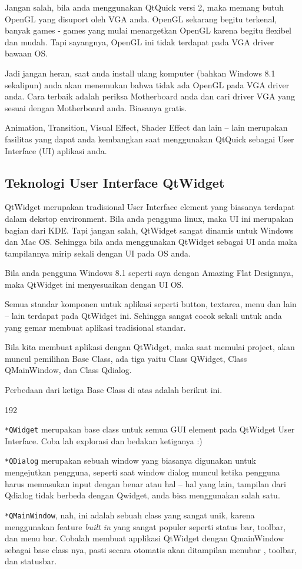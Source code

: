 Jangan salah, bila anda menggunakan QtQuick versi 2, maka memang butuh
OpenGL yang disuport oleh VGA anda. OpenGL sekarang begitu terkenal,
banyak games - games yang mulai menargetkan OpenGL karena begitu
flexibel dan mudah. Tapi sayangnya, OpenGL ini tidak terdapat pada VGA
driver bawaan OS.

Jadi jangan heran, saat anda install ulang komputer (bahkan Windows 8.1
sekalipun) anda akan menemukan bahwa tidak ada OpenGL pada VGA driver
anda. Cara terbaik adalah periksa Motherboard anda dan cari driver VGA
yang sesuai dengan Motherboard anda. Biasanya gratis.

Animation, Transition, Visual Effect, Shader Effect dan lain -- lain
merupakan fasilitas yang dapat anda kembangkan saat menggunakan QtQuick
sebagai User Interface (UI) aplikasi anda.

\subsection{Teknologi User Interface QtWidget}\label{teknologi-user-interface-qtwidget}

QtWidget merupakan tradisional User Interface element yang biasanya
terdapat dalam dekstop environment. Bila anda pengguna linux, maka UI
ini merupakan bagian dari KDE. Tapi jangan salah, QtWidget sangat
dinamis untuk Windows dan Mac OS. Sehingga bila anda menggunakan
QtWidget sebagai UI anda maka tampilannya mirip sekali dengan UI pada OS
anda.

Bila anda pengguna Windows 8.1 seperti saya dengan Amazing Flat
Designnya, maka QtWidget ini menyesuaikan dengan UI OS.

Semua standar komponen untuk aplikasi seperti button, textarea, menu dan
lain -- lain terdapat pada QtWidget ini. Sehingga sangat cocok sekali
untuk anda yang gemar membuat aplikasi tradisional standar.

Bila kita membuat aplikasi dengan QtWidget, maka saat memulai project,
akan muncul pemilihan Base Class, ada tiga yaitu Class QWidget, Class
QMainWindow, dan Class Qdialog.

Perbedaan dari ketiga Base Class di atas adalah berikut ini.

\begin{dingautolist}{192}
\item
  \texttt{*QWidget} merupakan base class untuk semua GUI element pada
  QtWidget User Interface. Coba lah explorasi dan bedakan ketiganya :)
\item
  \texttt{*QDialog} merupakan sebuah window yang biasanya digunakan
  untuk mengejutkan pengguna, seperti saat window dialog muncul ketika
  pengguna harus memasukan input dengan benar atau hal -- hal yang lain,
  tampilan dari Qdialog tidak berbeda dengan Qwidget, anda bisa
  menggunakan salah satu.
\item
  \texttt{*QMainWindow}, nah, ini adalah sebuah class yang sangat unik,
  karena menggunakan feature \emph{built in} yang sangat populer seperti
  status bar, toolbar, dan menu bar. Cobalah membuat applikasi QtWidget
  dengan QmainWindow sebagai base class nya, pasti secara otomatis akan
  ditampilan menubar , toolbar, dan statusbar.
\end{dingautolist}

